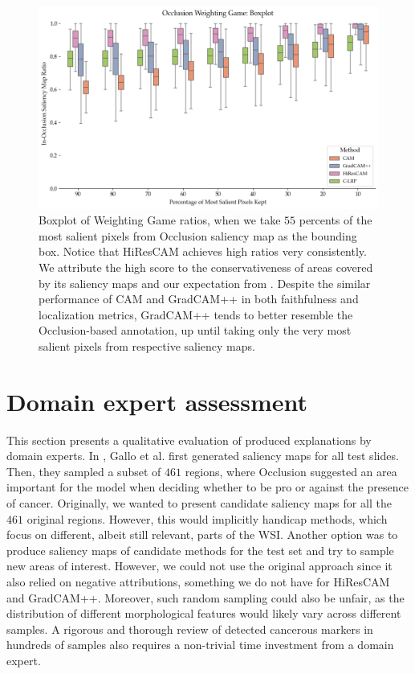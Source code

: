 \begin{figure}
    \begin{center}
    \begin{minipage}{1\textwidth}
      \includegraphics[width=\textwidth]{img/occlusion-weighting-game-boxplot.png}
    \end{minipage}
    \caption{Boxplot of Weighting Game ratios, when we take $55$ percents of the most salient pixels from Occlusion saliency map as the bounding box. Notice that HiResCAM achieves high ratios very consistently. We attribute the high score to the conservativeness of areas covered by its saliency maps and our expectation from . Despite the similar performance of CAM and GradCAM++ in both faithfulness and localization metrics, GradCAM++ tends to better resemble the Occlusion-based annotation, up until taking only the very most salient pixels from respective saliency maps.}
    \label{fig:occ-weighting-game-boxplot}
    \end{center}
\end{figure}

\section{Domain expert assessment}

This section presents a qualitative evaluation of produced explanations by domain experts.
In \cite{gallo}, Gallo et al. first generated saliency maps for all test slides.
Then, they sampled a subset of $461$ regions, where Occlusion suggested an area important for the model when deciding whether to be pro or against the presence of cancer.
Originally, we wanted to present candidate saliency maps for all the $461$ original regions.
However, this would implicitly handicap methods, which focus on different, albeit still relevant, parts of the WSI. 
Another option was to produce saliency maps of candidate methods for the test set and try to sample new areas of interest. However, we could not use the original approach since it also relied on negative attributions, something we do not have for HiResCAM and GradCAM++.
Moreover, such random sampling could also be unfair, as the distribution of different morphological features would likely vary across different samples.
A rigorous and thorough review of detected cancerous markers in hundreds of samples also requires a non-trivial time investment from a domain expert.

